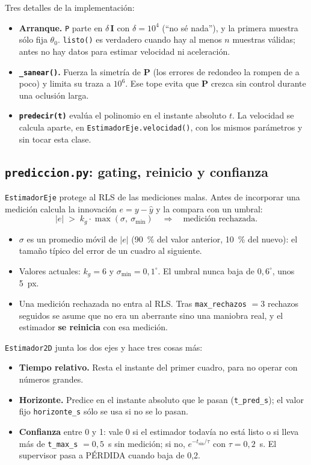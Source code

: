 \documentclass[11pt,a4paper]{article}
\newcommand{\cod}[1]{\texttt{#1}}
\newcommand{\gr}{^{\circ}}
\begin{document}
Tres detalles de la implementación:
\begin{itemize}
  \item \textbf{Arranque.} \cod{P} parte en $\delta\,\mathbf I$ con $\delta = 10^4$ (``no sé nada''), y la primera
        muestra sólo fija $\theta_0$. \cod{listo()} es verdadero cuando hay al menos $n$ muestras válidas; antes
        no hay datos para estimar velocidad ni aceleración.
  \item \textbf{\cod{\_sanear()}.} Fuerza la simetría de $\mathbf P$ (los errores de redondeo la rompen de a poco) y
        limita su traza a $10^6$. Ese tope evita que $\mathbf P$ crezca sin control durante una oclusión larga.
  \item \textbf{\cod{predecir(t)}} evalúa el polinomio en el instante absoluto $t$. La velocidad se calcula
        aparte, en \cod{EstimadorEje.velocidad()}, con los mismos parámetros y sin tocar esta clase.
\end{itemize}

\subsection{\cod{prediccion.py}: gating, reinicio y confianza}

\cod{EstimadorEje} protege al RLS de las mediciones malas. Antes de incorporar una medición calcula la
innovación $e = y - \hat y$ y la compara con un umbral:
\begin{equation}
  |e| \;>\; k_g \cdot \max(\sigma,\ \sigma_{\min}) \quad\Longrightarrow\quad \text{medición rechazada.}
\end{equation}
\begin{itemize}
  \item $\sigma$ es un promedio móvil de $|e|$ (90~\% del valor anterior, 10~\% del nuevo): el tamaño típico
        del error de un cuadro al siguiente.
  \item Valores actuales: $k_g = 6$ y $\sigma_{\min} = 0{,}1\gr$. El umbral nunca baja de $0{,}6\gr$, unos 5~px.
  \item Una medición rechazada no entra al RLS. Tras \cod{max\_rechazos} $= 3$ rechazos seguidos se asume que
        no era un aberrante sino una maniobra real, y el estimador \textbf{se reinicia} con esa medición.
\end{itemize}

\cod{Estimador2D} junta los dos ejes y hace tres cosas más:
\begin{itemize}
  \item \textbf{Tiempo relativo.} Resta el instante del primer cuadro, para no operar con números grandes.
  \item \textbf{Horizonte.} Predice en el instante absoluto que le pasan (\cod{t\_pred\_s}); el valor fijo
        \cod{horizonte\_s} sólo se usa si no se lo pasan.
  \item \textbf{Confianza} entre 0 y 1: vale 0 si el estimador todavía no está listo o si lleva más de
        \cod{t\_max\_s} $= 0{,}5$~s sin medición; si no, $e^{-t_{\mathrm{sin}}/\tau}$ con $\tau = 0{,}2$~s. El
        supervisor pasa a PÉRDIDA cuando baja de 0,2.
\end{itemize}
\end{document}
